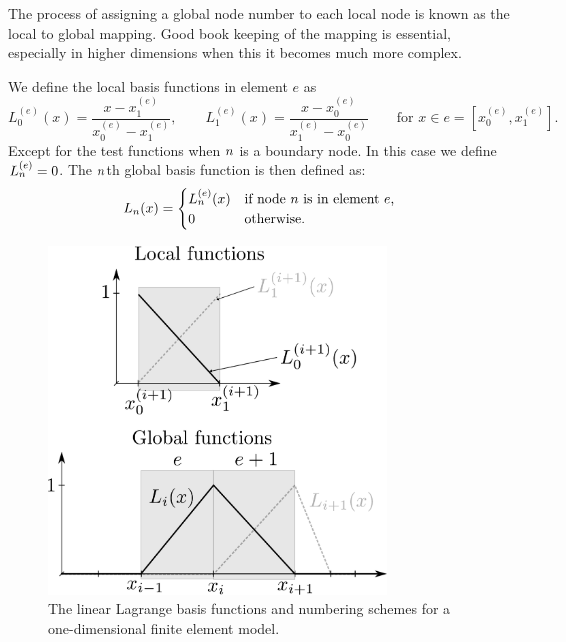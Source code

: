 The process of assigning a global node number to each local node is known as the
local to global mapping. Good book keeping of the mapping is essential,
especially in higher dimensions when this it becomes much more complex.

We define the local basis functions in element $e$ as
\begin{equation}
  L_{0}^{(e)}(x)=\dfrac{x-x_{1}^{(e)}}{x_{0}^{(e)}-x_{1}^{(e)}},\qquad
  L_{1}^{(e)}(x)=\dfrac{x-x_{0}^{(e)}}{x_{1}^{(e)}-x_{0}^{(e)}}
  \qquad\text{for }x\in e=[x_{0}^{(e)},x_{1}^{(e)}].
  \label{eq:32}
\end{equation}
Except for the test functions when $n$ is a boundary node. In this case we define $L_n^{(e)} = 0$.
The $n$th global basis function is then defined as:
\begin{equation}
  \label{eq:33}
  L_n(x) =
  \begin{cases}
    L_n^{(e)}(x) & \text{if node $n$ is in element $e$,} \\
    0 & \text{otherwise.}
  \end{cases}
\end{equation}

\begin{figure}
  \center
  \includegraphics[width=0.8\textwidth]{./images/local_global_functions}
  \caption{The linear Lagrange basis functions and numbering schemes for a one-dimensional
    finite element model.\label{fig:local_global_functions}}
\end{figure}

